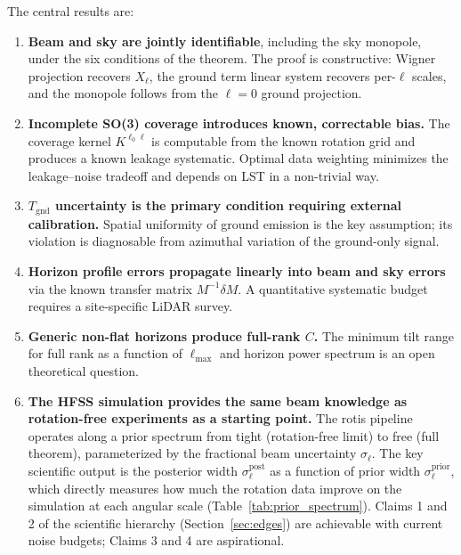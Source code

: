 \documentclass{aastex631}
\newcommand{\Tgnd}{T_\mathrm{gnd}}
\newcommand{\lmax}{\ell_\mathrm{max}}
\theoremstyle{plain}
\theoremstyle{remark}
\begin{document}
The central results are:

\begin{enumerate}

  \item \textbf{Beam and sky are jointly identifiable}, including the
    sky monopole, under the six conditions of the theorem.
    The proof is constructive: Wigner projection recovers $X_\ell$,
    the ground term linear system recovers per-$\ell$ scales, and
    the monopole follows from the $\ell=0$ ground projection.

  \item \textbf{Incomplete SO(3) coverage introduces known,
    correctable bias.}
    The coverage kernel $K^{\ell_0\ell}$ is computable from the
    known rotation grid and produces a known leakage systematic.
    Optimal data weighting minimizes the leakage--noise tradeoff
    and depends on LST in a non-trivial way.

  \item \textbf{$\Tgnd$ uncertainty is the primary condition
    requiring external calibration.}
    Spatial uniformity of ground emission is the key assumption;
    its violation is diagnosable from azimuthal variation of the
    ground-only signal.

  \item \textbf{Horizon profile errors propagate linearly into
    beam and sky errors} via the known transfer matrix
    $M^{-1}\delta M$. A quantitative systematic budget requires
    a site-specific LiDAR survey.

  \item \textbf{Generic non-flat horizons produce full-rank $C$.}
    The minimum tilt range for full rank as a function of $\lmax$
    and horizon power spectrum is an open theoretical question.

  \item \textbf{The HFSS simulation provides the same beam
    knowledge as rotation-free experiments as a starting point.}
    The rotis pipeline operates along a prior spectrum from
    tight (rotation-free limit) to free (full theorem), parameterized by
    the fractional beam uncertainty $\sigma_\ell$.
    The key scientific output is the posterior width
    $\sigma^\mathrm{post}_\ell$ as a function of prior width
    $\sigma^\mathrm{prior}_\ell$, which directly measures how
    much the rotation data improve on the simulation at each
    angular scale (Table~\ref{tab:prior_spectrum}).
    Claims 1 and 2 of the scientific hierarchy
    (Section~\ref{sec:edges}) are achievable with current noise
    budgets; Claims 3 and 4 are aspirational.

\end{enumerate}
\end{document}

